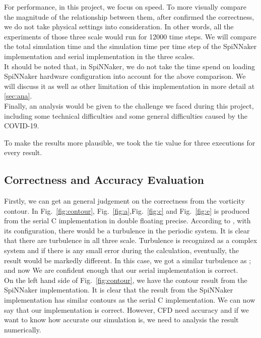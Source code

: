 For performance, in this project, we focus on speed. To more visually compare the magnitude of the relationship between them, after confirmed the correctness, we do not take physical settings into consideration. In other words, all the experiments of those three scale would run for 12000 time steps. We will compare the total simulation time and the simulation time per time step of the SpiNNaker implementation and serial implementation in the three scales. \\

It should be noted that, in SpiNNaker, we do not take the time spend on loading SpiNNaker hardware configuration into account for the above comparison. We will discuss it as well as other limitation of this implementation in more detail at \ref{sec:ana}.\\

Finally, an analysis would be given to the challenge we faced during this project, including some technical difficulties and some general difficulties caused by the COVID-19.

To make the results more plausible, we took the tie value for three executions for every result.\\
\subsection{Correctness and Accuracy Evaluation} \label{sec:caae}
Firstly, we can get an general judgement on the correctness from the vorticity contour. In Fig.~\ref{fig:contour}, Fig.~\ref{fig:a},Fig.~\ref{fig:c} and Fig.~\ref{fig:e} is produced from the serial C implementation in double floating precise. According to \cite{minion1997performance}, with its configuration, there would be a turbulence in the periodic system. It is clear that there are turbulence in all three scale. Turbulence is recognized as a complex system and if there is any small error during the calculation, eventually, the result would be markedly different. In this case, we got a similar turbulence as \cite{minion1997performance}; and now We are confident enough that our serial implementation is correct.\\

On the left hand side of Fig.~\ref{fig:contour}, we have the contour result from the SpiNNaker implementation. It is clear that the result from the SpiNNaker implementation has similar contours as the serial C implementation. We can now say that our implementation is correct. However, CFD need accuracy and if we want to know how accurate our simulation is, we need to analysis the result numerically.\\

